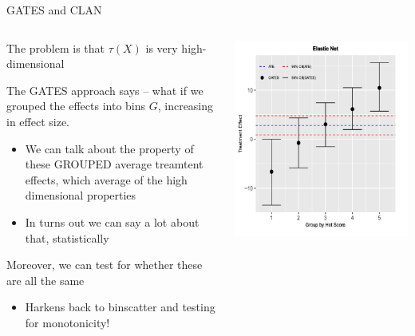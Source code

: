 \documentclass[notes,11pt, aspectratio=169]{beamer}
\newenvironment{wideitemize}{\itemize\addtolength{\itemsep}{10pt}}{\enditemize}
\begin{document}
\begin{frame}{GATES and CLAN}
    \begin{columns}[onlytextwidth, T] %
      \begin{column}{.5\textwidth}
  \begin{wideitemize}
  \item The problem is that $\tau(X)$ is very high-dimensional 
  \item The GATES approach says -- what if we grouped the effects into
    bins $G$, increasing in effect size.
    \begin{itemize}
    \item We can talk about the property of these GROUPED average treamtent effects, which average of the high dimensional properties
    \item In turns out we can say a lot about that, statistically
    \end{itemize}
  \item Moreover, we can test for whether these are all the same
    \begin{itemize}
    \item Harkens back to binscatter and testing for monotonicity!
    \end{itemize}
  \end{wideitemize}
      \end{column}%
      \hfill%
      \begin{column}{.5\textwidth}
        \includegraphics[width=\linewidth]{images/GATES.png}
      \end{column}%
    \end{columns}
\end{frame}
\end{document}
